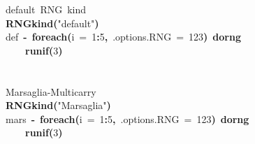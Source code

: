\documentclass[a4paper,12pt]{article}\usepackage{graphicx, color}
\makeatletter
\newcommand{\hlnumber}[1]{\textcolor[rgb]{0,0,0}{#1}}%
\newcommand{\hlfunctioncall}[1]{\textcolor[rgb]{0.501960784313725,0,0.329411764705882}{\textbf{#1}}}%
\newcommand{\hlstring}[1]{\textcolor[rgb]{0.6,0.6,1}{#1}}%
\newcommand{\hlkeyword}[1]{\textcolor[rgb]{0,0,0}{\textbf{#1}}}%
\newcommand{\hlargument}[1]{\textcolor[rgb]{0.690196078431373,0.250980392156863,0.0196078431372549}{#1}}%
\newcommand{\hlcomment}[1]{\textcolor[rgb]{0.180392156862745,0.6,0.341176470588235}{#1}}%
\newcommand{\hlassignement}[1]{\textcolor[rgb]{0,0,0}{\textbf{#1}}}%
\newcommand{\hlsymbol}[1]{\textcolor[rgb]{0,0,0}{#1}}%
\newcommand{\hlstd}[1]{\textcolor[rgb]{0,0,0}{#1}}%
\newenvironment{kframe}{%
 \def\FrameCommand##1{\hskip\@totalleftmargin \hskip-\fboxsep
 \colorbox{shadecolor}{##1}\hskip-\fboxsep
     \hskip-\linewidth \hskip-\@totalleftmargin \hskip\columnwidth}%
 \MakeFramed {\advance\hsize-\width
   \@totalleftmargin\z@ \linewidth\hsize
   \@setminipage}}%
 {\par\unskip\endMakeFramed}
\newenvironment{knitrout}{}{} %
\renewenvironment{knitrout}{\begin{footnotesize}}{\end{footnotesize}}
\makeatother
\begin{document}
\begin{knitrout}
\color{fgcolor}\begin{kframe}
\begin{flushleft}
\ttfamily\noindent
\hlcomment{\usebox{\hlnormalsizeboxhash}{\ }default{\ }RNG{\ }kind}\hspace*{\fill}\\
\hlstd{}\hlfunctioncall{RNGkind}\hlkeyword{(}\hlstring{"{}default"{}}\hlkeyword{)}\hspace*{\fill}\\
\hlstd{}\hlsymbol{def}{\ }\hlassignement{\usebox{\hlnormalsizeboxlessthan}-}{\ }\hlfunctioncall{foreach}\hlkeyword{(}\hlargument{i}{\ }\hlargument{=}{\ }\hlnumber{1}\hlkeyword{:}\hlnumber{5}\hlkeyword{,}{\ }\hlargument{.options.RNG}{\ }\hlargument{=}{\ }\hlnumber{123}\hlkeyword{)}{\ }\hlkeyword{\usebox{\hlnormalsizeboxpercent}dorng\usebox{\hlnormalsizeboxpercent}}{\ }\hlkeyword{\usebox{\hlnormalsizeboxopenbrace}}\hspace*{\fill}\\
\hlstd{}{\ }{\ }{\ }{\ }\hlfunctioncall{runif}\hlkeyword{(}\hlnumber{3}\hlkeyword{)}\hspace*{\fill}\\
\hlstd{}\hlkeyword{\usebox{\hlnormalsizeboxclosebrace}}\hspace*{\fill}\\
\hlstd{}\hspace*{\fill}\\
\hlstd{}\hlcomment{\usebox{\hlnormalsizeboxhash}{\ }Marsaglia-Multicarry}\hspace*{\fill}\\
\hlstd{}\hlfunctioncall{RNGkind}\hlkeyword{(}\hlstring{"{}Marsaglia"{}}\hlkeyword{)}\hspace*{\fill}\\
\hlstd{}\hlsymbol{mars}{\ }\hlassignement{\usebox{\hlnormalsizeboxlessthan}-}{\ }\hlfunctioncall{foreach}\hlkeyword{(}\hlargument{i}{\ }\hlargument{=}{\ }\hlnumber{1}\hlkeyword{:}\hlnumber{5}\hlkeyword{,}{\ }\hlargument{.options.RNG}{\ }\hlargument{=}{\ }\hlnumber{123}\hlkeyword{)}{\ }\hlkeyword{\usebox{\hlnormalsizeboxpercent}dorng\usebox{\hlnormalsizeboxpercent}}{\ }\hlkeyword{\usebox{\hlnormalsizeboxopenbrace}}\hspace*{\fill}\\
\hlstd{}{\ }{\ }{\ }{\ }\hlfunctioncall{runif}\hlkeyword{(}\hlnumber{3}\hlkeyword{)}\hspace*{\fill}\\

\end{flushleft}
\end{kframe}
\end{knitrout}
\end{document}
